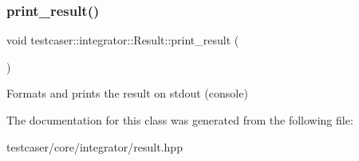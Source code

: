 \subsubsection{\texorpdfstring{print\_result()}{print\_result()}}
{\footnotesize\ttfamily void testcaser\+::integrator\+::\+Result\+::print\+\_\+result (\begin{DoxyParamCaption}{ }\end{DoxyParamCaption})\hspace{0.3cm}{\ttfamily [inline]}}



Formats and prints the result on stdout (console) 



The documentation for this class was generated from the following file\+:\begin{DoxyCompactItemize}
\item 
testcaser/core/integrator/result.\+hpp\end{DoxyCompactItemize}
